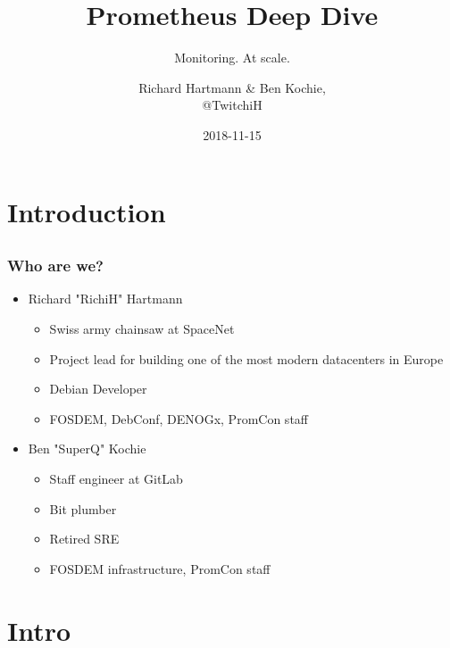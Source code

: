 \documentclass[t]{beamer}
\title{Prometheus Deep Dive}
\subtitle{Monitoring. At scale.}
\author{Richard Hartmann \& Ben Kochie,\\
@TwitchiH}
\date{2018-11-15}
\begin{document}
\setcounter{tocdepth}{1}



\section{Introduction}


\subsection{}

\begin{frame}
	\titlepage
\end{frame}


\subsection{}

\begin{frame}
	\frametitle{Who are we?}
	\begin{itemize}
		\item Richard "RichiH" Hartmann
		\begin{itemize}
			\item Swiss army chainsaw at SpaceNet
			\item Project lead for building one of the most modern datacenters in Europe
			\item Debian Developer
			\item FOSDEM, DebConf, DENOGx, PromCon staff
		\end{itemize}
		\item Ben "SuperQ" Kochie
		\begin{itemize}
			\item Staff engineer at GitLab
			\item Bit plumber
			\item Retired SRE
			\item FOSDEM infrastructure, PromCon staff
		\end{itemize}
	\end{itemize}
\end{frame}


\section{Intro}

\subsection{}
\end{document}
